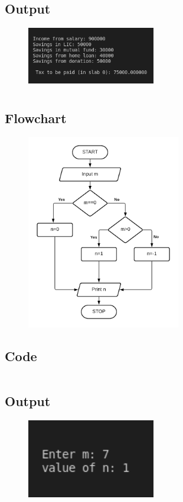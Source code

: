 \documentclass[12pt]{article}
\begin{document}
\subsection{Output}
\begin{figure}[h]
    \centering
    \includegraphics[width=0.5\textwidth]{3.png}
\end{figure}
\newpage
\section{}
\subsection{Flowchart}
\begin{figure}[h]
    \centering
    \includegraphics[width=0.6\textwidth]{Flowchart04.png}
\end{figure}
\newpage
\subsection{Code}
\inputminted{c}{q4.c}
\subsection{Output}
\begin{figure}[h]
    \centering
    \includegraphics[width=0.5\textwidth]{4.png}
\end{figure}
\newpage
\end{document}
